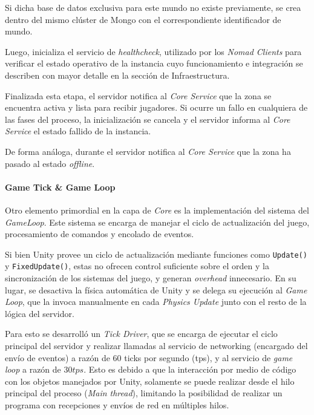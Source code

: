 Si dicha base de datos exclusiva para este mundo no existe previamente, se crea dentro del mismo clúster de Mongo
con el correspondiente identificador de mundo.

Luego, inicializa el servicio de \textit{healthcheck}, utilizado por los \textit{Nomad Clients} para verificar el 
estado operativo de la instancia cuyo funcionamiento e integración se describen con mayor detalle en la sección de Infraestructura.

\vspace{0.25cm}

Finalizada esta etapa, el servidor notifica al \textit{Core Service} que la zona se encuentra activa y lista para recibir jugadores.
Si ocurre un fallo en cualquiera de las fases del proceso, la inicialización se cancela y el servidor informa al \textit{Core Service}
el estado fallido de la instancia.

De forma análoga, durante el servidor notifica al \textit{Core Service} que la zona ha 
pasado al estado \textit{offline}.

\paragraph{Game Tick \& Game Loop}

Otro elemento primordial en la capa de \textit{Core} es la implementación del sistema del \textit{GameLoop}.
Este sistema se encarga de manejar el ciclo de actualización del juego, procesamiento de
comandos y encolado de eventos.

\vspace{0.25cm}

Si bien Unity provee un ciclo de actualización mediante funciones como \texttt{Update()} y \texttt{FixedUpdate()}, estas no ofrecen control
suficiente sobre el orden y la sincronización de los sistemas del juego, y generan \textit{overhead} innecesario.
En su lugar, se desactiva la física automática de Unity y se delega
su ejecución al \textit{Game Loop}, que la invoca manualmente en cada \textit{Physics Update} junto con el resto de la lógica del servidor.

Para esto se desarrolló un \textit{Tick Driver}, que se encarga de ejecutar el ciclo principal del servidor y realizar llamadas
al servicio de networking (encargado del envío de eventos) a razón de $60$ ticks por segundo (tps), y al servicio de \textit{game loop}
a razón de $30 tps$. Esto es debido a que la interacción por medio de código con los objetos manejados por Unity, solamente 
se puede realizar desde el hilo principal del proceso (\textit{Main thread}), limitando la posibilidad de realizar un programa
con recepciones y envíos de red en múltiples hilos.


